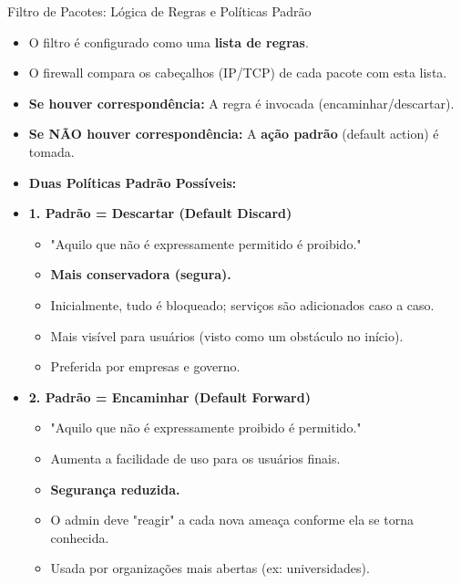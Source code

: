 \begin{frame}{Filtro de Pacotes: Lógica de Regras e Políticas Padrão}
    \begin{itemize}
        \item O filtro é configurado como uma \textbf{lista de regras}.
        \item O firewall compara os cabeçalhos (IP/TCP) de cada pacote com esta lista.

        \item \textbf{Se houver correspondência:} A regra é invocada (encaminhar/descartar).
        \item \textbf{Se NÃO houver correspondência:} A \textbf{ação padrão} (default action) é tomada.

        \item \textbf{Duas Políticas Padrão Possíveis:}

        \item \textbf{1. Padrão = Descartar (Default Discard)}
              \begin{itemize}
                  \item "Aquilo que não é expressamente permitido é proibido."
                  \item \textbf{Mais conservadora (segura).}
                  \item Inicialmente, tudo é bloqueado; serviços são adicionados caso a caso.
                  \item Mais visível para usuários (visto como um obstáculo no início).
                  \item Preferida por empresas e governo.
              \end{itemize}

        \item \textbf{2. Padrão = Encaminhar (Default Forward)}
              \begin{itemize}
                  \item "Aquilo que não é expressamente proibido é permitido."
                  \item Aumenta a facilidade de uso para os usuários finais.
                  \item \textbf{Segurança reduzida.}
                  \item O admin deve "reagir" a cada nova ameaça conforme ela se torna conhecida.
                  \item Usada por organizações mais abertas (ex: universidades).
              \end{itemize}
    \end{itemize}
\end{frame}

